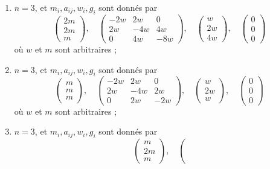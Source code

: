\begin{lemma}[Genre un]
\begin{enumerate}
$$\begin{matrix}
0
\end{matrix}
\right)
$$
où $w$ et $m$ sont arbitraires ;
\item
\label{item-up-up}
$n = 3$, et $m_i, a_{ij}, w_i, g_i$ sont donnés par
$$
\left(
\begin{matrix}
2m \\
2m \\
m
\end{matrix}
\right),
\quad
\left(
\begin{matrix}
-2w & 2w & 0 \\
2w & -4w & 4w \\
0 & 4w & -8w
\end{matrix}
\right),
\quad
\left(
\begin{matrix}
w \\
2w \\
4w
\end{matrix}
\right),
\quad
\left(
\begin{matrix}
0 \\
0 \\
0
\end{matrix}
\right)
$$
où $w$ et $m$ sont arbitraires ;
\item
\label{item-up-down}
$n = 3$, et $m_i, a_{ij}, w_i, g_i$ sont donnés par
$$
\left(
\begin{matrix}
m \\
m \\
m
\end{matrix}
\right),
\quad
\left(
\begin{matrix}
-2w & 2w & 0 \\
2w & -4w & 2w \\
0 & 2w & -2w
\end{matrix}
\right),
\quad
\left(
\begin{matrix}
w \\
2w \\
w
\end{matrix}
\right),
\quad
\left(
\begin{matrix}
0 \\
0 \\
0
\end{matrix}
\right)
$$
où $w$ et $m$ sont arbitraires ;
\item
\label{item-down-up}
$n = 3$, et $m_i, a_{ij}, w_i, g_i$ sont donnés par
$$
\left(
\begin{matrix}
m \\
2m \\
m
\end{matrix}
\right),
\quad
\left(
$$
\end{enumerate}
\end{lemma}
